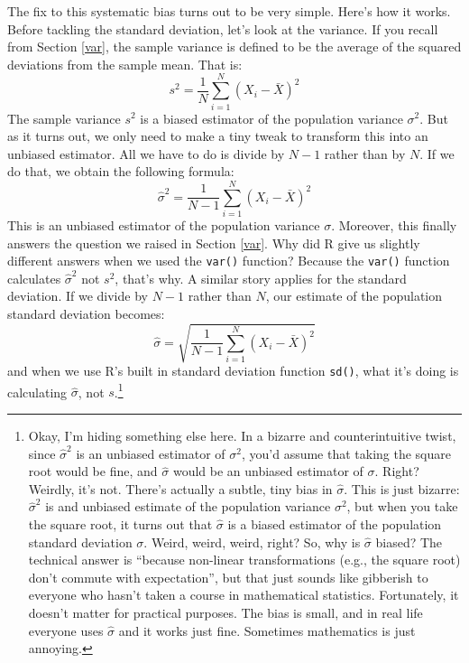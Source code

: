 \documentclass[spanish,]{book}
\let\rmarkdownfootnote\footnote%
\def\footnote{\protect\rmarkdownfootnote}
\begin{document}
The fix to this systematic bias turns out to be very simple. Here's how
it works. Before tackling the standard deviation, let's look at the
variance. If you recall from Section \ref{var}, the sample variance is
defined to be the average of the squared deviations from the sample
mean. That is: \[
s^2 = \frac{1}{N} \sum_{i=1}^N (X_i - \bar{X})^2
\] The sample variance \(s^2\) is a biased estimator of the population
variance \(\sigma^2\). But as it turns out, we only need to make a tiny
tweak to transform this into an unbiased estimator. All we have to do is
divide by \(N-1\) rather than by \(N\). If we do that, we obtain the
following formula: \[
\hat\sigma^2 = \frac{1}{N-1} \sum_{i=1}^N (X_i - \bar{X})^2 
\] This is an unbiased estimator of the population variance \(\sigma\).
Moreover, this finally answers the question we raised in Section
\ref{var}. Why did R give us slightly different answers when we used the
\texttt{var()} function? Because the \texttt{var()} function calculates
\(\hat\sigma^2\) not \(s^2\), that's why. A similar story applies for
the standard deviation. If we divide by \(N-1\) rather than \(N\), our
estimate of the population standard deviation becomes: \[
\hat\sigma = \sqrt{\frac{1}{N-1} \sum_{i=1}^N (X_i - \bar{X})^2} 
\] and when we use R's built in standard deviation function
\texttt{sd()}, what it's doing is calculating \(\hat\sigma\), not
\(s\).\footnote{Okay, I'm hiding something else here. In a bizarre and
  counterintuitive twist, since \(\hat\sigma^2\) is an unbiased
  estimator of \(\sigma^2\), you'd assume that taking the square root
  would be fine, and \(\hat\sigma\) would be an unbiased estimator of
  \(\sigma\). Right? Weirdly, it's not. There's actually a subtle, tiny
  bias in \(\hat\sigma\). This is just bizarre: \(\hat\sigma^2\) is and
  unbiased estimate of the population variance \(\sigma^2\), but when
  you take the square root, it turns out that \(\hat\sigma\) is a biased
  estimator of the population standard deviation \(\sigma\). Weird,
  weird, weird, right? So, why is \(\hat\sigma\) biased? The technical
  answer is ``because non-linear transformations (e.g., the square root)
  don't commute with expectation'', but that just sounds like gibberish
  to everyone who hasn't taken a course in mathematical statistics.
  Fortunately, it doesn't matter for practical purposes. The bias is
  small, and in real life everyone uses \(\hat\sigma\) and it works just
  fine. Sometimes mathematics is just annoying.}
\end{document}
